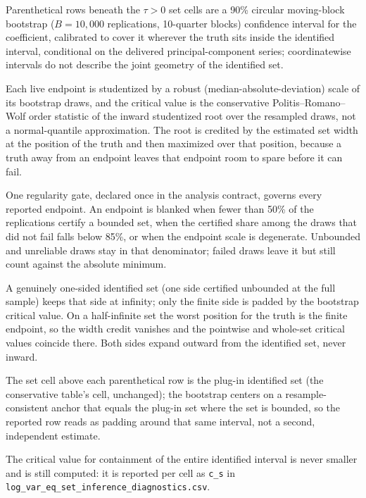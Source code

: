 \begin{table}[!htbp]
\begin{threeparttable}
\begin{tablenotes}[flushleft]
\item Parenthetical rows beneath the $\tau{>}0$ set cells are a 90\% circular moving-block bootstrap ($B=10{,}000$ replications, 10-quarter blocks) confidence interval for the coefficient, calibrated to cover it wherever the truth sits inside the identified interval, conditional on the delivered principal-component series; coordinatewise intervals do not describe the joint geometry of the identified set.
\item Each live endpoint is studentized by a robust (median-absolute-deviation) scale of its bootstrap draws, and the critical value is the conservative Politis--Romano--Wolf order statistic of the inward studentized root over the resampled draws, not a normal-quantile approximation. The root is credited by the estimated set width at the position of the truth and then maximized over that position, because a truth away from an endpoint leaves that endpoint room to spare before it can fail.
\item One regularity gate, declared once in the analysis contract, governs every reported endpoint. An endpoint is blanked when fewer than 50\% of the replications certify a bounded set, when the certified share among the draws that did not fail falls below 85\%, or when the endpoint scale is degenerate. Unbounded and unreliable draws stay in that denominator; failed draws leave it but still count against the absolute minimum.
\item A genuinely one-sided identified set (one side certified unbounded at the full sample) keeps that side at infinity; only the finite side is padded by the bootstrap critical value. On a half-infinite set the worst position for the truth is the finite endpoint, so the width credit vanishes and the pointwise and whole-set critical values coincide there. Both sides expand outward from the identified set, never inward.
\item The set cell above each parenthetical row is the plug-in identified set (the conservative table's cell, unchanged); the bootstrap centers on a resample-consistent anchor that equals the plug-in set where the set is bounded, so the reported row reads as padding around that same interval, not a second, independent estimate.
\item The critical value for containment of the entire identified interval is never smaller and is still computed: it is reported per cell as \texttt{c\_s} in \texttt{log\_var\_eq\_set\_inference\_diagnostics.csv}.
\end{tablenotes}
\end{threeparttable}
\end{table}
